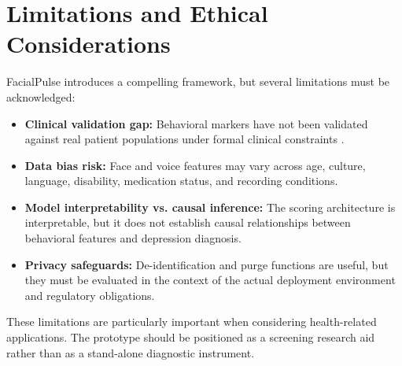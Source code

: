 \documentclass[conference, 12pt]{IEEEtran}
\begin{document}
\section{Limitations and Ethical Considerations}
FacialPulse introduces a compelling framework, but several limitations must be acknowledged:
\begin{itemize}[leftmargin=1.5em]
\item \textbf{Clinical validation gap:} Behavioral markers have not been validated against real patient populations under formal clinical constraints \cite{ref3}.
\item \textbf{Data bias risk:} Face and voice features may vary across age, culture, language, disability, medication status, and recording conditions.
\item \textbf{Model interpretability vs. causal inference:} The scoring architecture is interpretable, but it does not establish causal relationships between behavioral features and depression diagnosis.
\item \textbf{Privacy safeguards:} De-identification and purge functions are useful, but they must be evaluated in the context of the actual deployment environment and regulatory obligations.
\end{itemize}
These limitations are particularly important when considering health-related applications. The prototype should be positioned as a screening research aid rather than as a stand-alone diagnostic instrument.
\end{document}

